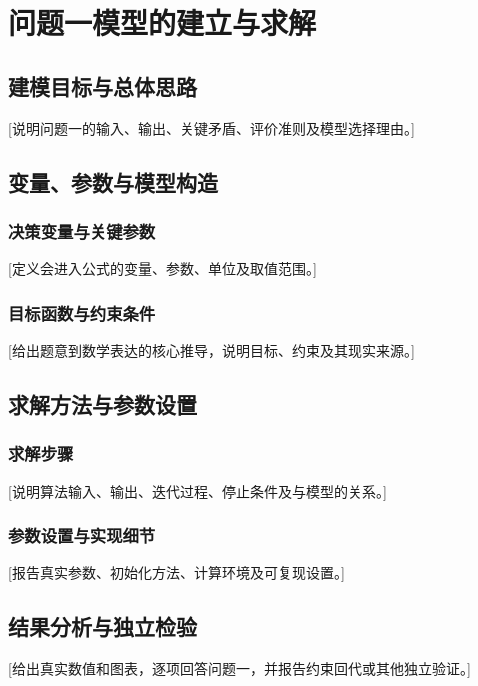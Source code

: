 \section{问题一模型的建立与求解}

\subsection{建模目标与总体思路}
[说明问题一的输入、输出、关键矛盾、评价准则及模型选择理由。]

\subsection{变量、参数与模型构造}
\subsubsection{决策变量与关键参数}
[定义会进入公式的变量、参数、单位及取值范围。]

\subsubsection{目标函数与约束条件}
[给出题意到数学表达的核心推导，说明目标、约束及其现实来源。]

\subsection{求解方法与参数设置}
\subsubsection{求解步骤}
[说明算法输入、输出、迭代过程、停止条件及与模型的关系。]

\subsubsection{参数设置与实现细节}
[报告真实参数、初始化方法、计算环境及可复现设置。]

\subsection{结果分析与独立检验}
[给出真实数值和图表，逐项回答问题一，并报告约束回代或其他独立验证。]
